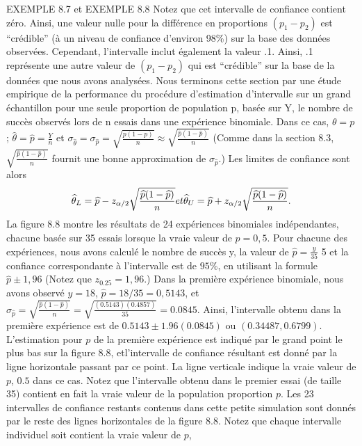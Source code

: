 \documentclass[]{article}
\begin{document}
EXEMPLE 8.7 et EXEMPLE 8.8 Notez que cet intervalle de confiance
contient zéro. Ainsi, une valeur nulle pour la différence en proportions
\((p_1 - p_2)\) est ``crédible'' (à un niveau de confiance d'environ
98\%) sur la base des données observées. Cependant, l'intervalle inclut
également la valeur .1. Ainsi, .1 représente une autre valeur de
\((p_1 - p_2)\) qui est ``crédible'' sur la base de la données que nous
avons analysées. Nous terminons cette section par une étude empirique de
la performance du procédure d'estimation d'intervalle sur un grand
échantillon pour une seule proportion de population p, basée sur Y, le
nombre de succès observés lors de n essais dans une expérience
binomiale. Dans ce cas, \(\theta = p\);
\(\widehat{\theta} = \widehat{p} = \frac{Y}{n}\) et
\(\sigma_\widehat{\theta} = \sigma_\widehat{p} = \sqrt{\frac{p(1-p)}{n}} \approx \sqrt{\frac{\widehat{p}(1-\widehat{p})}{n}}\)
(Comme dans la section 8.3,
\(\sqrt{\frac{\widehat{p}(1-\widehat{p})}{n}}\) fournit une bonne
approximation de \(\sigma_\widehat{p}\).) Les limites de confiance sont
alors \[
\widehat{\theta}_L = \widehat{p}-z_{\alpha/2}\sqrt{\frac{\widehat{p}(1-\widehat{p})}{n}}
\space et \space
\widehat{\theta}_U = \widehat{p}+z_{\alpha/2}\sqrt{\frac{\widehat{p}(1-\widehat{p})}{n}}.
\] La figure 8.8 montre les résultats de 24 expériences binomiales
indépendantes, chacune basée sur 35 essais lorsque la vraie valeur de
\(p = 0,5\). Pour chacune des expériences, nous avons calculé le nombre
de succès y, la valeur de \(\widehat{p} = \frac{y}{35}\) 5 et la
confiance correspondante à l'intervalle est de \(95\%\), en utilisant la
formule \(\widehat{p} \pm 1,96\) (Notez que \(z_{0.25} = 1,96\).) Dans
la première expérience binomiale, nous avons observé \(y = 18\),
\(\widehat{p}= 18/35 = 0,5143\), et
\(\sigma_\widehat{p} = \sqrt{\frac{\widehat{p}(1-\widehat{p})}{n}} = \sqrt{\frac{(0.5143)(0.4857)}{35}} = 0.0845\).
Ainsi, l'intervalle obtenu dans la première expérience est de
\(0.5143 \pm 1.96(0.0845)\) ou \((0.34487, 0.6799)\). L'estimation pour
\(p\) de la première expérience est indiqué par le grand point le plus
bas sur la figure 8.8, etl'intervalle de confiance résultant est donné
par la ligne horizontale passant par ce point. La ligne verticale
indique la vraie valeur de \(p\), \(0.5\) dans ce cas. Notez que
l'intervalle obtenu dans le premier essai (de taille 35) contient en
fait la vraie valeur de la population proportion \(p\). Les 23
intervalles de confiance restants contenus dans cette petite simulation
sont donnés par le reste des lignes horizontales de la figure 8.8. Notez
que chaque intervalle individuel soit contient la vraie valeur de \(p\),
\end{document}
